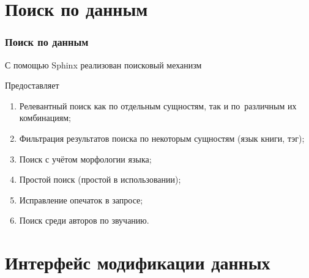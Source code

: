 \documentclass[utf8,handout]{beamer}
\begin{document}
\section{Поиск по данным}
	\begin{frame}
 		\frametitle{Поиск по данным}
 		С помощью Sphinx реализован поисковый механизм
 		\begin{block}{}
			Предоставляет
			\begin{enumerate}
				\item  Релевантный поиск как по отдельным сущностям, так и по~различным их комбинациям;
				\item  Фильтрация результатов поиска по некоторым сущностям (язык книги, тэг);
				\item  Поиск с учётом морфологии языка;
				\item  Простой поиск (простой в использовании);
				\item  Исправление опечаток в запросе;
				\item  Поиск среди авторов по звучанию.
			\end{enumerate}
		\end{block}
	\end{frame}
	
\section{Интерфейс модификации данных}
\end{document}
